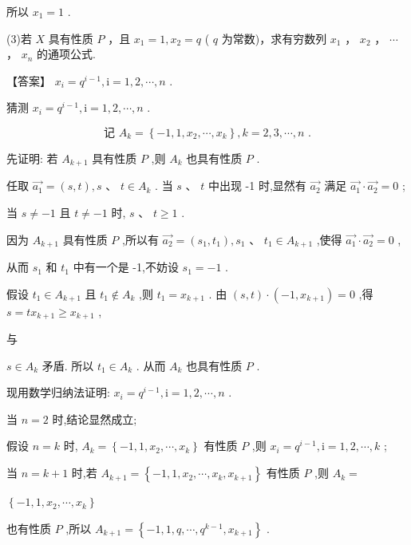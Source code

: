 \documentclass[10pt]{article}
\begin{document}
所以 \({x}_{1} = 1\) .

(3)若 \(X\) 具有性质 \(P\) ，且 \({x}_{1} = 1,{x}_{2} = q\) ( \(q\) 为常数)，求有穷数列 \({x}_{1}\) ， \({x}_{2}\) ， \(\cdots\) ， \({x}_{n}\) 的通项公式.

【答案】 \({x}_{i} = {q}^{i - 1},\mathrm{i} = 1,2,\cdots ,n\) .

猜测 \({x}_{i} = {q}^{i - 1},\mathrm{i} = 1,2,\cdots ,n\) .

\[
\text{ 记 }{A}_{k} = \left\{  {-1,1,{x}_{2},\cdots ,{x}_{k}}\right\}  ,k = 2,3,\cdots ,n\text{ . }
\]

先证明: 若 \({A}_{k + 1}\) 具有性质 \(P\) ,则 \({A}_{k}\) 也具有性质 \(P\) .

任取 \(\overrightarrow{{a}_{1}} = \left( {s,t}\right) ,s\text{ 、 }t \in  {A}_{k}\) . 当 \(s\text{ 、 }t\) 中出现 -1 时,显然有 \(\overrightarrow{{a}_{2}}\) 满足 \(\overrightarrow{{a}_{1}} \cdot  \overrightarrow{{a}_{2}} = 0\) ;

当 \(s \neq   - 1\) 且 \(t \neq   - 1\) 时, \(s\text{ 、 }t \geq  1\) .

因为 \({A}_{k + 1}\) 具有性质 \(P\) ,所以有 \(\overrightarrow{{a}_{2}} = \left( {{s}_{1},{t}_{1}}\right) ,{s}_{1}\text{ 、 }{t}_{1} \in  {A}_{k + 1}\) ,使得 \(\overrightarrow{{a}_{1}} \cdot  \overrightarrow{{a}_{2}} = 0\) ,

从而 \({s}_{1}\) 和 \({t}_{1}\) 中有一个是 -1,不妨设 \({s}_{1} =  - 1\) .

假设 \({t}_{1} \in  {A}_{k + 1}\) 且 \({t}_{1} \notin  {A}_{k}\) ,则 \({t}_{1} = {x}_{k + 1}\) . 由 \(\left( {s,t}\right)  \cdot  \left( {-1,{x}_{k + 1}}\right)  = 0\) ,得 \(s = t{x}_{k + 1} \geq  {x}_{k + 1}\) ,

与

\(s \in  {A}_{k}\) 矛盾. 所以 \({t}_{1} \in  {A}_{k}\) . 从而 \({A}_{k}\) 也具有性质 \(P\) .

现用数学归纳法证明: \({x}_{i} = {q}^{i - 1},\mathrm{i} = 1,2,\cdots ,n\) .

当 \(n = 2\) 时,结论显然成立;

假设 \(n = k\) 时, \({A}_{k} = \left\{  {-1,1,{x}_{2},\cdots ,{x}_{k}}\right\}\) 有性质 \(P\) ,则 \({x}_{i} = {q}^{i - 1},\mathrm{i} = 1,2,\cdots ,k\) ;

当 \(n = k + 1\) 时,若 \({A}_{k + 1} = \left\{  {-1,1,{x}_{2},\cdots ,{x}_{k},{x}_{k + 1}}\right\}\) 有性质 \(P\) ,则 \({A}_{k} =\)

\(\left\{  {-1,1,{x}_{2},\cdots ,{x}_{k}}\right\}\)

也有性质 \(P\) ,所以 \({A}_{k + 1} = \left\{  {-1,1,q,\cdots ,{q}^{k - 1},{x}_{k + 1}}\right\}\) .
\end{document}
